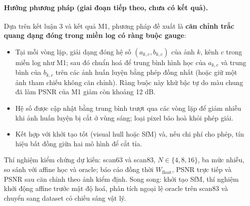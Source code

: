 \documentclass[11pt,a4paper]{article}
\begin{document}
\paragraph{Hướng phương pháp (giai đoạn tiếp theo, chưa có kết quả).} Dựa trên kết luận 3 và kết quả M1, phương pháp đề xuất là \textbf{căn chỉnh trắc quang dạng đóng trong miền log có ràng buộc gauge}:
\begin{itemize}
  \item Tại mỗi vòng lặp, giải dạng đóng hệ số $(a_{k,c}, b_{k,c})$ của ảnh $k$, kênh $c$ trong miền log như M1; sau đó chuẩn hoá để trung bình hình học của $a_{k,c}$ và trung bình của $b_{k,c}$ trên các ảnh huấn luyện bằng phép đồng nhất (hoặc giữ một ảnh tham chiếu không căn chỉnh). Ràng buộc này khử bậc tự do màu chung đã làm PSNR của M1 giảm còn khoảng 12 dB.
  \item Hệ số được cập nhật bằng trung bình trượt qua các vòng lặp để giảm nhiễu khi ảnh huấn luyện bị cắt ở vùng sáng; loại pixel bão hoà khỏi phép giải.
  \item Kết hợp với khởi tạo tốt (visual hull hoặc SfM) và, nếu chi phí cho phép, tín hiệu bất đồng giữa hai mô hình để cắt tỉa.
\end{itemize}
Thí nghiệm kiểm chứng dự kiến: scan63 và scan83, $N\in\{4, 8, 16\}$, ba mức nhiễu, so sánh với affine học và oracle; báo cáo đồng thời $W_{\text{float}}$, PSNR trực tiếp và PSNR sau căn chỉnh theo ảnh kiểm định. Song song: khởi tạo SfM, thí nghiệm khởi động affine trước mật độ hoá, phân tích ngoại lệ oracle trên scan83 và chuyển sang dataset có chiếu sáng vật lý.
\end{document}
